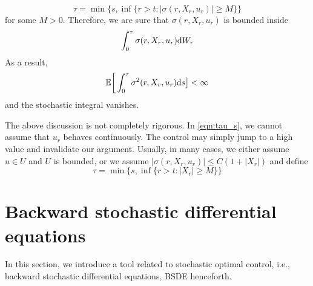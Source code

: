 \documentclass[11pt]{book}
\newcommand{\ds}{\text{\normalfont d}s}
\newcommand{\dW}{\text{\normalfont d}W}
\begin{document}
\begin{equation}\label{eqn:tau_s}
    \tau=\min\Big\{s,\inf\{r>t: |\sigma(r,X_r,u_r)|\ge M \}\Big\}
\end{equation}
for some $M>0$. Therefore, we are sure that  $\sigma(r,X_r,u_r)$ is bounded inside
\[
\int_0^\tau \sigma(r,X_r,u_r)\dW_r
\]
As a result, 
\[
\mathbb{E}\bigg[\int_0^\tau \sigma^2(r,X_r,u_r)\ds\big]<\infty
\]
and the stochastic integral vanishes. 
\begin{rem}
    The above discussion is not completely rigorous. In \eqref{eqn:tau_s}, we cannot assume that $u_r$ behaves continuously. The control may simply jump to a high value and invalidate our argument. Usually, in many cases, we either assume $u\in U$ and $U$ is bounded, or we assume $|\sigma(r,X_r,u_r)|\le C(1+|X_r|)$ and define 
    \[
    \tau=\min\Big\{s,\inf\{r>t: |X_r|\ge M \}\Big\}
    \]
\end{rem}
\section{Backward stochastic differential equations}
In this section, we introduce a tool related to stochastic optimal control, i.e., backward stochastic differential equations, BSDE henceforth. 
\end{document}

